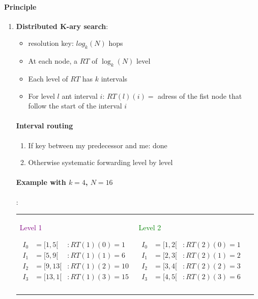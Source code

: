 \paragraph{Principle}

\begin{enumerate}
    \item \textbf{Distributed K-ary search}:
        \begin{itemize}
            \item resolution key: $log_k(N)$ hops
            \item At each node, a $RT$ of $\log_k(N)$ level
            \item Each level of $RT$ has $k$ intervals
            \item For level $l$ ant interval $i$: $RT(l)(i) = $ adress of the fist node
                that follow the start of the interval $i$
        \end{itemize}

        \paragraph{Interval routing}
        \begin{enumerate}
            \item If key between my predecessor and me: done
            \item Otherwise systematic forwarding level by level
        \end{enumerate}

        \paragraph{Example with $k=4$, $N=16$}:

        \begin{tabular}{m{6cm}m{6cm}m{4cm}}

            \begin{center}\textcolor{purple}{Level 1} \end{center}
            \begin{eqnarray*}
                I_0 &= [1, 5[ &: RT(1)(0) = 1\\
                I_1 &= [5, 9[ &: RT(1)(1) = 6\\
                I_2 &= [9, 13[ &: RT(1)(2) = 10\\
                I_3 &= [13, 1[ &: RT(1)(3) = 15\\
            \end{eqnarray*}
            &
            \begin{center}\textcolor{green}{Level 2} \end{center}
            \begin{eqnarray*}
                I_0 &= [1, 2[ &: RT(2)(0) = 1\\
                I_1 &= [2, 3[ &: RT(2)(1) = 2\\
                I_2 &= [3, 4[ &: RT(2)(2) = 3\\
                I_3 &= [4, 5[ &: RT(2)(3) = 6\\
            \end{eqnarray*}


\end{tabular}
\end{enumerate}
